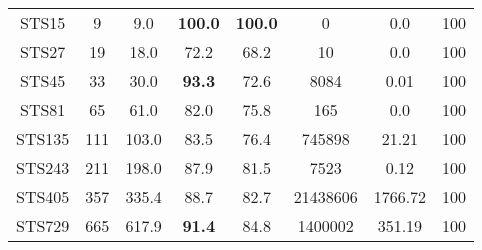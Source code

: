 \begin{longtable}{@{\extracolsep{5pt}}cccccccc}
	STS15 &
		9 & 9.0 &
			\textbf{100.0}
		&
			\textbf{100.0}
		& 0 & 0.0 & 100
	\\
	STS27 &
		19 & 18.0 &
			72.2
		&
			68.2
		& 10 & 0.0 & 100
	\\
	STS45 &
		33 & 30.0 &
			\textbf{93.3}
		&
			72.6
		& 8084 & 0.01 & 100
	\\
	STS81 &
		65 & 61.0 &
			82.0
		&
			75.8
		& 165 & 0.0 & 100
	\\
	STS135 &
		111 & 103.0 &
			83.5
		&
			76.4
		& 745898 & 21.21 & 100
	\\
	STS243 &
		211 & 198.0 &
			87.9
		&
			81.5
		& 7523 & 0.12 & 100
	\\
	STS405 &
		357 & 335.4 &
			88.7
		&
			82.7
		& 21438606 & 1766.72 & 100
	\\
	STS729 &
		665 & 617.9 &
			\textbf{91.4}
		&
			84.8
		& 1400002 & 351.19 & 100
	\\
\end{longtable}
